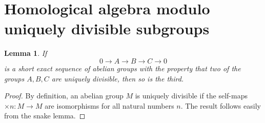 \documentclass[11pt, oneside, dvipsnames, svgnames, table, final]{amsart}
\theoremstyle{plain}
\newtheorem{lemma}[thm]{Lemma}
\theoremstyle{definition}
\theoremstyle{remark}
\newcommand{\<}[1]{{\langle}#1 {\rangle}}
\begin{document}
\appendix

\section{Homological algebra modulo uniquely divisible subgroups}
\label{sec:homol-algebra-modulo}

\begin{lemma} \label{lem:2of3divisibility}
  If
  \[ 0 \to A \to B \to C \to 0 \]
  is a short exact sequence of abelian groups with the property that two of the groups $A,B,C$ are uniquely divisible, then so is the third.
\end{lemma}
\begin{proof}
    By definition, an abelian group $M$ is uniquely divisible if the self-maps $\times n : M \to M$ are isomorphisms for all natural numbers $n$. The result follows easily from the snake lemma.
\end{proof}
\end{document}
